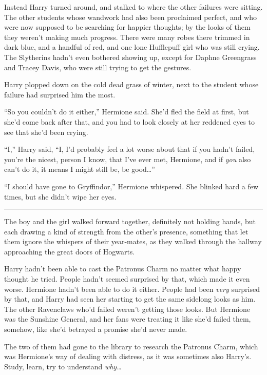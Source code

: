 Instead Harry turned around, and stalked to where the other failures
were sitting. The other students whose wandwork had also been proclaimed
perfect, and who were now supposed to be searching for happier thoughts;
by the looks of them they weren't making much progress. There were many
robes there trimmed in dark blue, and a handful of red, and one lone
Hufflepuff girl who was still crying. The Slytherins hadn't even
bothered showing up, except for Daphne Greengrass and Tracey Davis, who
were still trying to get the gestures.

Harry plopped down on the cold dead grass of winter, next to the student
whose failure had surprised him the most.

``So you couldn't do it either,'' Hermione said. She'd fled the field at
first, but she'd come back after that, and you had to look closely at
her reddened eyes to see that she'd been crying.

``I,'' Harry said, ``I, I'd probably feel a lot worse about that if you
hadn't failed, you're the nicest, person I know, that I've ever met,
Hermione, and if \emph{you} also can't do it, it means I might still be,
be good\ldots{}''

``I should have gone to Gryffindor,'' Hermione whispered. She blinked
hard a few times, but she didn't wipe her eyes.

\begin{center}\rule{3in}{0.4pt}\end{center}

The boy and the girl walked forward together, definitely not holding
hands, but each drawing a kind of strength from the other's presence,
something that let them ignore the whispers of their year-mates, as they
walked through the hallway approaching the great doors of Hogwarts.

Harry hadn't been able to cast the Patronus Charm no matter what happy
thought he tried. People hadn't seemed surprised by that, which made it
even worse. Hermione hadn't been able to do it either. People had been
\emph{very} surprised by that, and Harry had seen her starting to get
the same sidelong looks as him. The other Ravenclaws who'd failed
weren't getting those looks. But Hermione was the Sunshine General, and
her fans were treating it like she'd failed them, somehow, like she'd
betrayed a promise she'd never made.

The two of them had gone to the library to research the Patronus Charm,
which was Hermione's way of dealing with distress, as it was sometimes
also Harry's. Study, learn, try to understand \emph{why\ldots{}}

